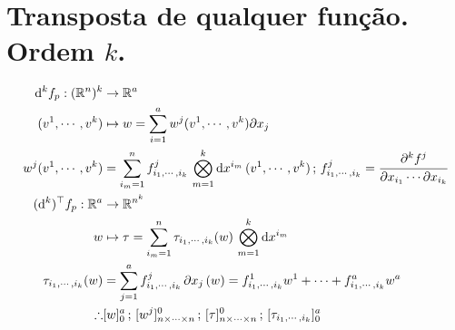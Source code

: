\documentclass[12pt]{article}
\begin{document}
\section{Transposta de qualquer fun\c{c}\~ao. Ordem $k$.}

\begin{align}
	\mathrm{d}^k f_p : (\mathbb{R}^n)^k &\rightarrow \mathbb{R}^a \\
	(v^1, \cdots, v^k) &\mapsto w = \sum_{i = 1}^a w^j(v^1, \cdots, v^k) \partial x_j \\
	w^j(v^1, \cdots, v^k) &= \sum_{i_m = 1}^n f_{i_1, \cdots, i_k}^j\, \bigotimes_{m = 1}^{k} \mathrm{d}x^{i_m} \,(v^1, \cdots, v^k)\,;\,f^j_{i_1, \cdots, i_k} = \cfrac{\partial^k f^j}{\partial x_{i_1} \cdots \partial x_{i_k}} \\
	(\mathrm{d}^k)^\top f_p : \mathbb{R}^a &\rightarrow \mathbb{R}^{n^k} \\
	w &\mapsto \tau = \sum_{i_m = 1}^n \tau_{i_1, \cdots, i_k}(w)\, \bigotimes_{m = 1}^{k} \mathrm{d}x^{i_m} \\
	\tau_{i_1, \cdots, i_k} (w) &= \sum_{j = 1}^a f_{i_1, \cdots, i_k}^j\, \partial x_j\,(w) = f_{i_1, \cdots, i_k}^1 w^1 + \cdots + f_{i_1, \cdots, i_k}^a w^a \\
	\therefore &[w]_0^a\,;\,[w^j]_{n \times \cdots \times n}^0\,;\,[\tau]_{n \times \cdots \times n}^0\,;\,[\tau_{i_1, \cdots, i_k}]_0^a
\end{align}
\end{document}
